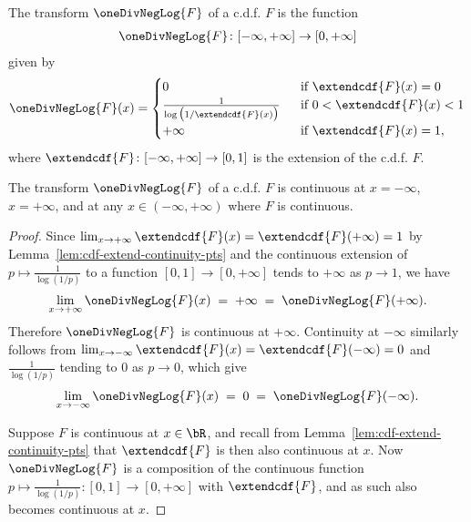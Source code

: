 \begin{definition}
  \label{def:one-div-neg-log-cdf}
  \leanok
  The transform $\oneDivNegLog{F}$ of a c.d.f. $F$ is the function
  \begin{align*}
    \oneDivNegLog{F} \colon [-\infty,+\infty] \to [0,+\infty]
  \end{align*}
  given by
  \begin{align*}
    \oneDivNegLog{F}(x) = \begin{cases}
      0 & \; \text{ if } \extendcdf{F}(x) = 0 \\
      \frac{1}{\log \big( 1/\extendcdf{F}(x) \big)} & \; \text{ if } 0 < \extendcdf{F}(x) < 1 \\
      +\infty & \; \text{ if } \extendcdf{F}(x) = 1 ,
      \end{cases}
  \end{align*}
  where $\extendcdf{F} \colon [-\infty,+\infty] \to [0,1]$ is the extension of the c.d.f. $F$.
\end{definition}

\begin{lemma}
  \label{lem:one-div-neg-log-cdf-continuity-pts}
  \leanok
  The transform $\oneDivNegLog{F}$ of a c.d.f. $F$ is continuous
  at $x = -\infty$, $x = + \infty$, and at any
  $x \in (-\infty,+\infty)$ where $F$ is continuous.
\end{lemma}
\begin{proof}
  Since $\lim_{x \to +\infty} \extendcdf{F}(x) = \extendcdf{F}(+\infty) = 1$
  by Lemma~\ref{lem:cdf-extend-continuity-pts} and the continuous extension
  of $p \mapsto \frac{1}{\log(1/p)}$ to a function $[0,1] \to [0,+\infty]$
  tends to $+\infty$ as $p \to 1$, we have
  \begin{align*}
    \lim_{x \to +\infty} \oneDivNegLog{F}(x)
    \; = \; +\infty \; = \; \oneDivNegLog{F}(+\infty) .
  \end{align*}
  Therefore $\oneDivNegLog{F}$ is continuous at $+\infty$.
  Continuity at $-\infty$ similarly follows from
  $\lim_{x \to -\infty} \extendcdf{F}(x) = \extendcdf{F}(-\infty) = 0$
  and $\frac{1}{\log(1/p)}$ tending to $0$
  as $p \to 0$, which give
  \begin{align*}
    \lim_{x \to -\infty} \oneDivNegLog{F}(x)
    \; = \; 0 \; = \; \oneDivNegLog{F}(-\infty) .
  \end{align*}

  Suppose $F$ is continuous at $x \in \bR$,
  and recall from Lemma~\ref{lem:cdf-extend-continuity-pts} that
  $\extendcdf{F}$ is then also continuous at $x$.
  Now $\oneDivNegLog{F}$ is a composition of the continuous function
  $p \mapsto \frac{1}{\log(1/p)} \colon [0,1] \to [0,+\infty]$ with
  $\extendcdf{F}$, and as such also becomes continuous at $x$.
\end{proof}

